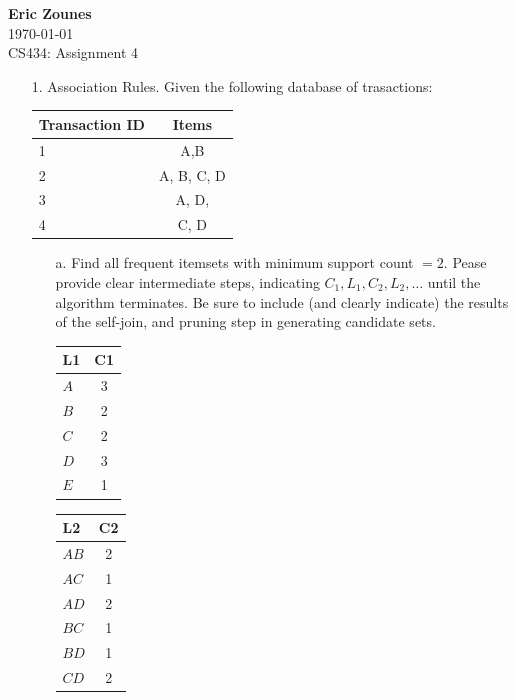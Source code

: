 \documentclass[12pt,letterpaper]{article}
\begin{document}
\setcounter{subsection}{2} 
\begin{flushright}
\end{flushright}
\begin{flushleft}
\textbf{Eric Zounes} \\
\today \\ 
CS434: Assignment 4
\end{flushleft}

\begin{enumerate} 
	\item[1.] Association Rules. Given the following database of trasactions: \\
	\begin{center}
	\begin{tabular}{| l | c |}   
		\hline
		Transaction ID & Items \\ \hline
		1 & A,B  \\ \hline
		2 & A, B, C, D  \\ \hline
		3 & A, D, \\ \hline
		4 & C, D \\ \hline 
	\end{tabular} 
	\end{center} 
	\begin{enumerate} 
		\item[a.] Find all frequent itemsets with minimum support count $= 2$. Pease provide clear intermediate steps, indicating $C_{1},L_{1},C_{2},L_{2}, \ldots$ until the algorithm terminates. Be sure to include (and clearly indicate) the results of the self-join, and pruning step in generating candidate sets. \\
    
		\begin{tabular}{| l | c |}   
		\hline
		L1 & C1 \\ \hline
	    \cellcolor{green}$A$ & 3  \\ \hline
		\cellcolor{green}$B$ & 2  \\ \hline
		\cellcolor{green}$C$ & 2 \\ \hline
		\cellcolor{green}$D$ & 3 \\ \hline 
		\cellcolor{red}$E$ & 1 \\ \hline 
		\end{tabular} 	
	
		\begin{tabular}{| l | c |}   
		\hline
		L2 & C2 \\ \hline
	    \cellcolor{green}$A B$ & 2  \\ \hline
		\cellcolor{red}$A C$ & 1  \\ \hline
		\cellcolor{green}$A D$ & 2 \\ \hline
		\cellcolor{red}$B C$ & 1 \\ \hline 
		\cellcolor{red}$B D$ & 1 \\ \hline 
		\cellcolor{green}$C D$ & 2 \\ \hline 
		\end{tabular} 	
		

\end{enumerate}
\end{enumerate}
\end{document}
